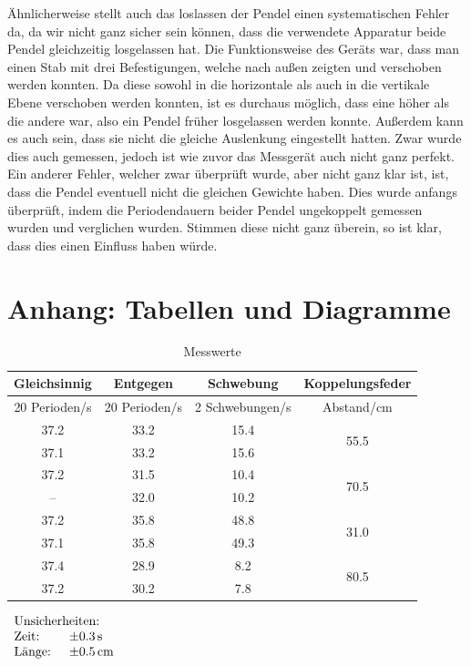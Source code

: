 \documentclass[11pt,a4paper]{article}
\begin{document}
\"Ahnlicherweise stellt auch das loslassen der Pendel einen systematischen Fehler da, da wir nicht ganz sicher sein k\"onnen, dass die verwendete Apparatur beide Pendel gleichzeitig losgelassen hat. Die Funktionsweise des Ger\"ats war, dass man einen Stab mit drei Befestigungen, welche nach au\ss en zeigten und verschoben werden konnten. Da diese sowohl in die horizontale als auch in die vertikale Ebene verschoben werden konnten, ist es durchaus m\"oglich, dass eine h\"oher als die andere war, also ein Pendel fr\"uher losgelassen werden konnte. Au\ss erdem kann es auch sein, dass sie nicht die gleiche Auslenkung eingestellt hatten. Zwar wurde dies auch gemessen, jedoch ist wie zuvor das Messger\"at auch nicht ganz perfekt.\\
Ein anderer Fehler, welcher zwar \"uberpr\"uft wurde, aber nicht ganz klar ist, ist, dass die Pendel eventuell nicht die gleichen Gewichte haben. Dies wurde anfangs \"uberpr\"uft, indem die Periodendauern beider Pendel ungekoppelt gemessen wurden und verglichen wurden. Stimmen diese nicht ganz \"uberein, so ist klar, dass dies einen Einfluss haben w\"urde.

\pagebreak

\section{Anhang: Tabellen und Diagramme}

\begin{table}[h]
\centering
\caption{Messwerte} \vspace{11pt}

\begin{tabular}{cccc}
\textrm{Gleichsinnig} & \textrm{Entgegen} & \textrm{Schwebung} & \textrm{Koppelungsfeder}\\
\toprule
\textrm{20 Perioden}/\textrm{s} & \textrm{20 Perioden}/\textrm{s} & \textrm{2 Schwebungen}/\textrm{s} & \textrm{Abstand}/\textrm{cm}\\
\midrule 
37.2 & 33.2 & 15.4 & \multirow{2}{*}{55.5}\\
37.1 & 33.2 & 15.6 &\\
\hline 
37.2 & 31.5 & 10.4 & \multirow{2}{*}{70.5}\\
 --  & 32.0 & 10.2 &\\
\hline 
37.2 & 35.8 & 48.8 & \multirow{2}{*}{31.0}\\ 
37.1 & 35.8 & 49.3 &\\ 
\hline
37.4 & 28.9 & \phantom{0}8.2 & \multirow{2}{*}{80.5}\\
37.2 & 30.2 & \phantom{0}7.8 &\\ 
\bottomrule
\end{tabular}
$\begin{array}{ll}
\multicolumn{2}{l}{\textrm{Unsicherheiten:}}\\
\textrm{Zeit: } & \pm 0.3\, \textrm{s}\\
\textrm{Länge: } & \pm 0.5\, \textrm{cm}\\
\end{array}$
\label{Tab:1}
\end{table}
\end{document}
